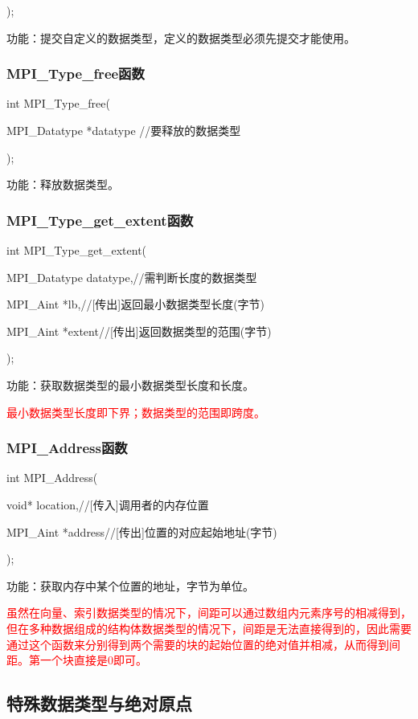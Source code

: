 \documentclass[UTF8]{article}%
\begin{document}
);

功能：提交自定义的数据类型，定义的数据类型必须先提交才能使用。

\subsubsection{MPI\_Type\_free函数}

int MPI\_Type\_free(

    \qquad MPI\_Datatype *datatype //要释放的数据类型

);

功能：释放数据类型。

\subsubsection{MPI\_Type\_get\_extent函数}

int MPI\_Type\_get\_extent(

    \qquad MPI\_Datatype datatype,//需判断长度的数据类型

    \qquad MPI\_Aint     *lb,//[传出]返回最小数据类型长度(字节)

    \qquad MPI\_Aint     *extent//[传出]返回数据类型的范围(字节)

);

功能：获取数据类型的最小数据类型长度和长度。

\textcolor{red}{最小数据类型长度即下界；数据类型的范围即跨度。}

\subsubsection{MPI\_Address函数}

int MPI\_Address(

    \qquad void* location,//[传入]调用者的内存位置

    \qquad MPI\_Aint *address//[传出]位置的对应起始地址(字节)
    
);

功能：获取内存中某个位置的地址，字节为单位。

\textcolor{red}{虽然在向量、索引数据类型的情况下，间距可以通过数组内元素序号的相减得到，但在多种数据组成的结构体数据类型的情况下，间距是无法直接得到的，因此需要通过这个函数来分别得到两个需要的块的起始位置的绝对值并相减，从而得到间距。第一个块直接是0即可。}

\subsection{特殊数据类型与绝对原点}
\end{document}
